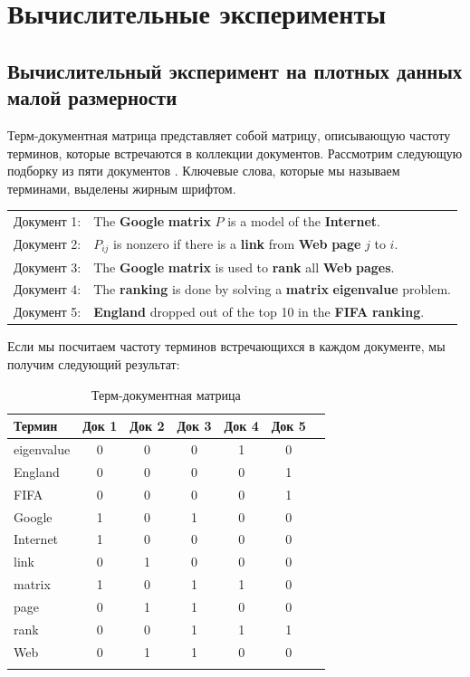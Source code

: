 
\newpage
\chapter{Вычислительные эксперименты}





\section{Вычислительный эксперимент на плотных данных малой размерности}

Терм-документная матрица представляет собой матрицу, описывающую частоту терминов,
которые встречаются в коллекции документов.
Рассмотрим следующую подборку из пяти документов \cite{elden}.
Ключевые слова, которые мы называем терминами,
выделены жирным шрифтом.

\begin{longtable*}{ l p{12cm} }
 Документ 1: & The \textbf{Google} \textbf{matrix} $P$ is a model of the \textbf{Internet}. \\
 Документ 2: & $P_{ij}$ is nonzero if there is a \textbf{link} from \textbf{Web} \textbf{page} $j$ to $i$.\\
 Документ 3: & The \textbf{Google} \textbf{matrix} is used to \textbf{rank} all \textbf{Web} \textbf{pages}.\\
 Документ 4: & The \textbf{ranking} is done by solving a \textbf{matrix} \textbf{eigenvalue} problem.\\
 Документ 5: & \textbf{England} dropped out of the top 10 in the \textbf{FIFA} \textbf{ranking}.\\
\end{longtable*}

Если мы посчитаем частоту терминов встречающихся в каждом документе, мы получим следующий результат:

 \begin{longtable}{ l | c c c c c c }
 Термин      & Док 1 & Док 2 & Док 3 & Док 4 & Док 5 \\
 \hline
 eigenvalue  & 0 & 0 & 0 & 1 & 0 \\
 England     & 0 & 0 & 0 & 0 & 1 \\
 FIFA        & 0 & 0 & 0 & 0 & 1 \\
 Google      & 1 & 0 & 1 & 0 & 0 \\
 Internet    & 1 & 0 & 0 & 0 & 0 \\
 link        & 0 & 1 & 0 & 0 & 0 \\
 matrix      & 1 & 0 & 1 & 1 & 0 \\
 page        & 0 & 1 & 1 & 0 & 0 \\
 rank        & 0 & 0 & 1 & 1 & 1 \\
 Web         & 0 & 1 & 1 & 0 & 0 \\
 \caption{Терм-документная матрица}
\end{longtable}

